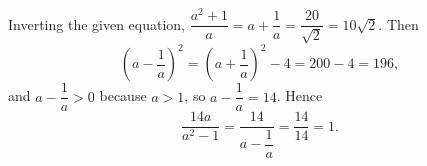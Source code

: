 Inverting the given equation, $\dfrac{a^2+1}{a}=a+\dfrac1a=\dfrac{20}{\sqrt2}=10\sqrt2$. Then
\[\left(a-\dfrac1a\right)^2=\left(a+\dfrac1a\right)^2-4=200-4=196,\]
and $a-\dfrac1a>0$ because $a>1$, so $a-\dfrac1a=14$. Hence
\[\dfrac{14a}{a^2-1}=\dfrac{14}{a-\dfrac1a}=\dfrac{14}{14}=\boxed{1}.\]
